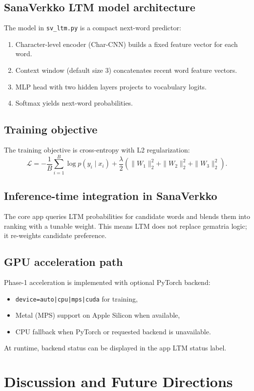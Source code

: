 \documentclass[11pt,a4paper]{report}
\begin{document}
\section{SanaVerkko LTM model architecture}
The model in \texttt{sv\_ltm.py} is a compact next-word predictor:
\begin{enumerate}
  \item Character-level encoder (Char-CNN) builds a fixed feature vector for each word.
  \item Context window (default size 3) concatenates recent word feature vectors.
  \item MLP head with two hidden layers projects to vocabulary logits.
  \item Softmax yields next-word probabilities.
\end{enumerate}

\section{Training objective}
The training objective is cross-entropy with L2 regularization:
\[
\mathcal{L} = -\frac{1}{B}\sum_{i=1}^{B}\log p(y_i\mid x_i)
+ \frac{\lambda}{2}\left(\|W_1\|_2^2 + \|W_2\|_2^2 + \|W_3\|_2^2\right).
\]

\section{Inference-time integration in SanaVerkko}
The core app queries LTM probabilities for candidate words and blends them into ranking with a tunable weight. This means LTM does not replace gematria logic; it re-weights candidate preference.

\section{GPU acceleration path}
Phase-1 acceleration is implemented with optional PyTorch backend:
\begin{itemize}
  \item \texttt{device=auto|cpu|mps|cuda} for training,
  \item Metal (MPS) support on Apple Silicon when available,
  \item CPU fallback when PyTorch or requested backend is unavailable.
\end{itemize}
At runtime, backend status can be displayed in the app LTM status label.

\chapter{Discussion and Future Directions}
\end{document}
